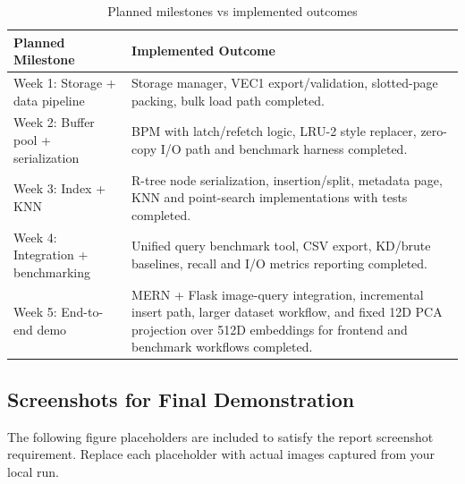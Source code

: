 \documentclass[11pt,a4paper]{article}
\begin{document}
\begin{table}[H]
\centering
\caption{Planned milestones vs implemented outcomes}
\begin{tabular}{p{}p{}}
\toprule
Planned Milestone & Implemented Outcome \\
\midrule
Week 1: Storage + data pipeline & Storage manager, VEC1 export/validation, slotted-page packing, bulk load path completed. \\
Week 2: Buffer pool + serialization & BPM with latch/refetch logic, LRU-2 style replacer, zero-copy I/O path and benchmark harness completed. \\
Week 3: Index + KNN & R-tree node serialization, insertion/split, metadata page, KNN and point-search implementations with tests completed. \\
Week 4: Integration + benchmarking & Unified query benchmark tool, CSV export, KD/brute baselines, recall and I/O metrics reporting completed. \\
Week 5: End-to-end demo & MERN + Flask image-query integration, incremental insert path, larger dataset workflow, and fixed 12D PCA projection over 512D embeddings for frontend and benchmark workflows completed. \\
\bottomrule
\end{tabular}
\end{table}

\subsection{Screenshots for Final Demonstration}

The following figure placeholders are included to satisfy the report screenshot requirement. Replace each placeholder with actual images captured from your local run.
\end{document}
